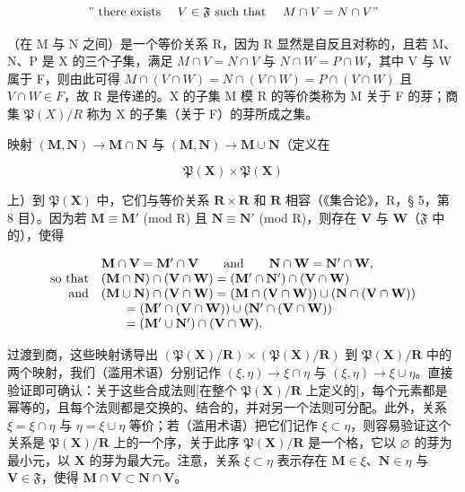 \[
" \text { there   exists } \quad V \in \mathfrak {F} \text { such   that } \quad M \cap V = N \cap V"
\]

（在 M 与 N 之间）是一个等价关系 R，因为 R 显然是自反且对称的，且若 M、N、P 是 X 的三个子集，满足 \(M \cap V = N \cap V\) 与 \(N \cap W = P \cap W\)，其中 V 与 W 属于 F，则由此可得 \(M \cap (V \cap W) = N \cap (V \cap W) = P \cap (V \cap W)\) 且 \(V \cap W \in F\)，故 R 是传递的。X 的子集 M 模 R 的等价类称为 M 关于 F 的芽；商集 \(\mathfrak{P}(X)/R\) 称为 X 的子集（关于 F）的芽所成之集。

映射 \((\mathbf{M},\mathbf{N})\to \mathbf{M}\cap \mathbf{N}\) 与 \((\mathbf{M},\mathbf{N})\rightarrow \mathbf{M}\cup \mathbf{N}\)（定义在

\[
\mathfrak {P} (\mathbf {X}) \times \mathfrak {P} (\mathbf {X})
\]

上）到 \(\mathfrak{P}(\mathbf{X})\) 中，它们与等价关系 \(\mathbf{R} \times \mathbf{R}\) 和 \(\mathbf{R}\) 相容（《集合论》，R，§ 5，第 8 目）。因为若 \(\mathbf{M} \equiv \mathbf{M}'\) (mod R) 且 \(\mathbf{N} \equiv \mathbf{N}'\) (mod R)，则存在 \(\mathbf{V}\) 与 \(\mathbf{W}\)（\(\mathfrak{F}\) 中的），使得

\[
\begin{array}{r l} & {\mathbf {M} \cap \mathbf {V} = \mathbf {M} ^ {\prime} \cap \mathbf {V} \qquad \mathrm{and} \qquad \mathbf {N} \cap \mathbf {W} = \mathbf {N} ^ {\prime} \cap \mathbf {W},} \\ {\mathrm{so\ that}} & {(\mathbf {M} \cap \mathbf {N}) \cap (\mathbf {V} \cap \mathbf {W}) = (\mathbf {M} ^ {\prime} \cap \mathbf {N} ^ {\prime}) \cap (\mathbf {V} \cap \mathbf {W})} \\ {\mathrm{and}} & {(\mathbf {M} \cup \mathbf {N}) \cap (\mathbf {V} \cap \mathbf {W}) = (\mathbf {M} \cap (\mathbf {V} \cap \mathbf {W})) \cup (\mathbf {N} \cap (\mathbf {V} \cap \mathbf {W}))} \\ & {\qquad = (\mathbf {M} ^ {\prime} \cap (\mathbf {V} \cap \mathbf {W})) \cup (\mathbf {N} ^ {\prime} \cap (\mathbf {V} \cap \mathbf {W}))} \\ & {\qquad = (\mathbf {M} ^ {\prime} \cup \mathbf {N} ^ {\prime}) \cap (\mathbf {V} \cap \mathbf {W}).} \end{array}
\]

过渡到商，这些映射诱导出 \((\mathfrak{P}(\mathbf{X}) / \mathbf{R}) \times (\mathfrak{P}(\mathbf{X}) / \mathbf{R})\) 到 \(\mathfrak{P}(\mathbf{X}) / \mathbf{R}\) 中的两个映射，我们（滥用术语）分别记作 \((\xi, \eta) \to \xi \cap \eta\) 与 \((\xi, \eta) \to \xi \cup \eta\)。直接验证即可确认：关于这些合成法则{[}在整个 \(\mathfrak{P}(\mathbf{X}) / \mathbf{R}\) 上定义的{]}，每个元素都是幂等的，且每个法则都是交换的、结合的，并对另一个法则可分配。此外，关系 \(\xi = \xi \cap \eta\) 与 \(\eta = \xi \cup \eta\) 等价；若（滥用术语）把它们记作 \(\xi \subset \eta\)，则容易验证这个关系是 \(\mathfrak{P}(\mathbf{X}) / \mathbf{R}\) 上的一个序，关于此序 \(\mathfrak{P}(\mathbf{X}) / \mathbf{R}\) 是一个格，它以 \(\varnothing\) 的芽为最小元，以 \(\mathbf{X}\) 的芽为最大元。注意，关系 \(\xi \subset \eta\) 表示存在 \(\mathbf{M} \in \xi\)、\(\mathbf{N} \in \eta\) 与 \(\mathbf{V} \in \mathfrak{F}\)，使得 \(\mathbf{M} \cap \mathbf{V} \subset \mathbf{N} \cap \mathbf{V}\)。

